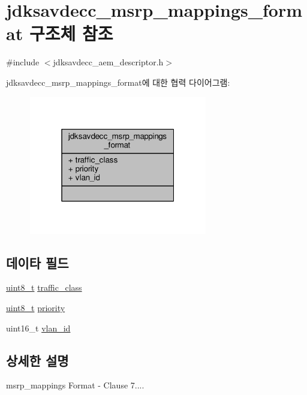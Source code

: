 \hypertarget{structjdksavdecc__msrp__mappings__format}{}\section{jdksavdecc\+\_\+msrp\+\_\+mappings\+\_\+format 구조체 참조}
\label{structjdksavdecc__msrp__mappings__format}


{\ttfamily \#include $<$jdksavdecc\+\_\+aem\+\_\+descriptor.\+h$>$}



jdksavdecc\+\_\+msrp\+\_\+mappings\+\_\+format에 대한 협력 다이어그램\+:
\nopagebreak
\begin{figure}[H]
\begin{center}
\leavevmode
\includegraphics[width=220pt]{structjdksavdecc__msrp__mappings__format__coll__graph}
\end{center}
\end{figure}
\subsection*{데이타 필드}
\begin{DoxyCompactItemize}
\item 
\hyperlink{stdint_8h_aba7bc1797add20fe3efdf37ced1182c5}{uint8\+\_\+t} \hyperlink{structjdksavdecc__msrp__mappings__format_af92a6e10a8b9f2e12a072402f1be80c4}{traffic\+\_\+class}
\item 
\hyperlink{stdint_8h_aba7bc1797add20fe3efdf37ced1182c5}{uint8\+\_\+t} \hyperlink{structjdksavdecc__msrp__mappings__format_a0ad043071ccc7a261d79a759dc9c6f0c}{priority}
\item 
uint16\+\_\+t \hyperlink{structjdksavdecc__msrp__mappings__format_ad9a532da576820f8630b96c16692aa5a}{vlan\+\_\+id}
\end{DoxyCompactItemize}


\subsection{상세한 설명}
msrp\+\_\+mappings Format -\/ Clause 7.... 

